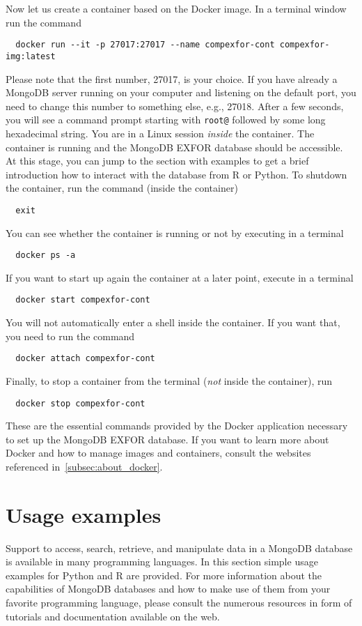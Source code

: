 \documentclass[12pt,a4paper]{scrartcl}
\begin{document}
 Now let us create a container based on the Docker image.
 In a terminal window run the command
\begin{verbatim}
  docker run --it -p 27017:27017 --name compexfor-cont compexfor-img:latest\end{verbatim}
  Please note that the first number, 27017, is your choice.
  If you have already a MongoDB server running on your computer and listening on the default port, you need to change this number to something else, e.g., 27018.  
 After a few seconds, you will see a command prompt starting with \verb#root@# followed by some long hexadecimal string.
 You are in a Linux session \textit{inside} the container.
 The container is running and the MongoDB EXFOR database should be accessible.
 At this stage, you can jump to the section with examples to get a brief introduction how to interact with the database from R or Python.
 To shutdown the container, run the command (inside the container)
\begin{verbatim}
  exit
\end{verbatim}
You can see whether the container is running or not by executing in a terminal
\begin{verbatim}
  docker ps -a
\end{verbatim}
 If you want to start up again the container at a later point, execute in a terminal
\begin{verbatim}
  docker start compexfor-cont
\end{verbatim} 
 You will not automatically enter a shell inside the container.
 If you want that, you need to run the command
\begin{verbatim}
  docker attach compexfor-cont
\end{verbatim}
Finally, to stop a container from the terminal (\textit{not} inside the container), run
\begin{verbatim}
  docker stop compexfor-cont
\end{verbatim}
These are the essential commands provided by the Docker application necessary to set up the MongoDB EXFOR database.
If you want to learn more about Docker and how to manage images and containers, consult the websites referenced in~\cref{subsec:about_docker}.

 \section{Usage examples}
 \label{sec:usage_examples}
 Support to access, search, retrieve, and manipulate data in a MongoDB database is available in many programming languages.
 In this section simple usage examples for Python and R are provided.
 For more information about the capabilities of MongoDB databases and how to make use of them from your favorite programming language, please consult the numerous resources in form of tutorials and documentation available on the web.
 
\end{document}
